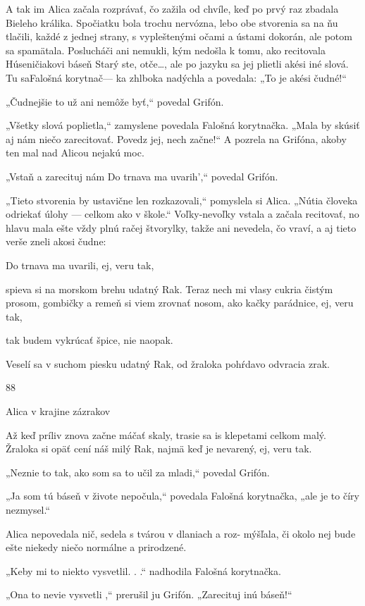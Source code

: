 \documentclass[12pt]{book}
\begin{document}
\begin{Parallel}[p]{}{}
{A tak im Alica začala rozprávať, čo zažila od chvíle, keď
po prvý raz zbadala Bieleho králika. Spočiatku bola trochu
nervózna, lebo obe stvorenia sa na ňu tlačili, každé z jednej
strany, s vypleštenými očami a ústami dokorán, ale potom
sa spamätala. Poslucháči ani nemukli, kým nedošla k tomu,
ako recitovala Húseničiakovi báseň Starý ste, otče…, ale
po jazyku sa jej plietli akési iné slová. Tu saFalošná korytnač—
ka zhlboka nadýchla a povedala: „To je akési čudné!“

„Čudnejšie to už ani nemôže byť,“ povedal Grifón.

„Všetky slová poplietla,“ zamyslene povedala Falošná
korytnačka. „Mala by skúsiť aj nám niečo zarecitovať.
Povedz jej, nech začne!“ A pozrela na Grifóna, akoby ten
mal nad Alicou nejakú moc.

„Vstaň a zarecituj nám Do trnava ma uvarih',“ povedal
Grifón.

„Tieto stvorenia by ustavične len rozkazovali,“ pomyslela
si Alica. „Nútia človeka odriekať úlohy — celkom ako
v škole.“ Voľky-nevoľky vstala a začala recitovať, no hlavu
mala ešte vždy plnú račej štvorylky, takže ani nevedela, čo
vraví, a aj tieto verše zneli akosi čudne:

Do trnava ma uvarili, ej, veru tak,

spieva si na morskom brehu udatný Rak.
Teraz nech mi vlasy cukria čistým prosom,
gombičky a remeň si viem zrovnať nosom,
ako kačky parádnice, ej, veru tak,

tak budem vykrúcať špice, nie naopak.

Veselí sa v suchom piesku udatný Rak,
od žraloka pohŕdavo odvracia zrak.

88

Alica v krajine zázrakov

Až keď príliv znova začne máčať skaly,
trasie sa is klepetami celkom malý.
Žraloka si opäť cení náš milý Rak,
najmä keď je nevarený, ej, veru tak.

„Neznie to tak, ako som sa to učil za mladi,“ povedal
Grifón.

„Ja som tú báseň v živote nepočula,“ povedala Falošná
korytnačka, „ale je to číry nezmysel.“

Alica nepovedala nič, sedela s tvárou v dlaniach a roz-
mýšľala, či okolo nej bude ešte niekedy niečo normálne
a prirodzené.

„Keby mi to niekto vysvetlil. . .“ nadhodila Falošná
korytnačka.

„Ona to nevie vysvetli ,“ prerušil ju Grifón. „Zarecituj
inú báseň!“

}
\end{Parallel}
\end{document}
